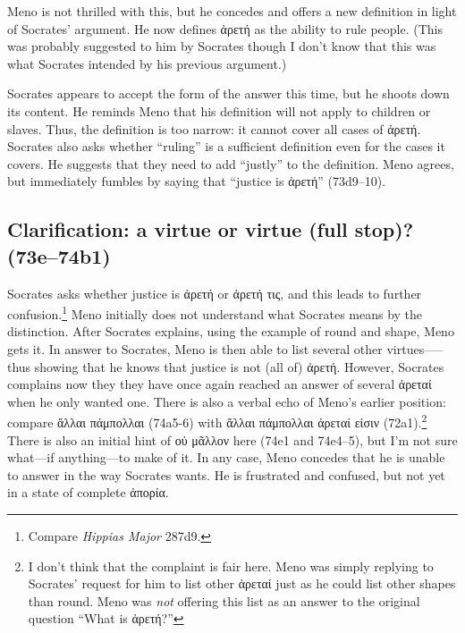 \documentclass[12pt,letterpaper]{article}
\begin{document}
Meno is not thrilled with this, but he concedes and offers a new definition in light of Socrates' argument. He now defines \textgreek{ἀρετή} as the ability to rule people. (This was probably suggested to him by Socrates though I don't know that this was what Socrates intended by his previous argument.)

Socrates appears to accept the form of the answer this time, but he shoots down its content. He reminds Meno that his definition will not apply to children or slaves. Thus, the definition is too narrow: it cannot cover all cases of \textgreek{ἀρετή}. Socrates also asks whether ``ruling'' is a sufficient definition even for the cases it covers. He suggests that they need to add ``justly'' to the definition. Meno agrees, but immediately fumbles by saying that ``justice is \textgreek{ἀρετή}'' (73d9--10).

\subsection{Clarification: a virtue or virtue (full stop)? (73e--74b1)}

Socrates asks whether justice is \textgreek{ἀρετή} or \textgreek{ἀρετή τις}, and this leads to further confusion.\footnote{Compare \textit{Hippias Major} 287d9.} Meno initially does not understand what Socrates means by the distinction. After Socrates explains, using the example of round and shape, Meno gets it. In answer to Socrates, Meno is then able to list several other virtues--—thus showing that he knows that justice is not (all of) \textgreek{ἀρετή}. However, Socrates complains now they they have once again reached an answer of several \textgreek{ἀρεταί} when he only wanted one. There is also a verbal echo of Meno's earlier position: compare \textgreek{ἄλλαι πάμπολλαι} (74a5-6) with \textgreek{ἄλλαι πάμπολλαι ἀρεταί εἰσιν} (72a1).\footnote{I don't think that the complaint is fair here. Meno was simply replying to Socrates' request for him to list other \textgreek{ἀρεταί} just as he could list other shapes than round. Meno was \textit{not} offering this list as an answer to the original question ``What is \textgreek{ἀρετή}?''} There is also an initial hint of \textgreek{οὐ μᾶλλον} here (74e1 and 74e4--5), but I'm not sure what—if anything—to make of it. In any case, Meno concedes that he is unable to answer in the way Socrates wants. He is frustrated and confused, but not yet in a state of complete \textgreek{ἀπορία}.
\end{document}
